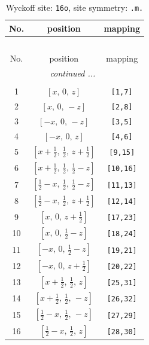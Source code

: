 \documentclass[fleqn,8pt]{jsarticle}
\begin{document}
\renewcommand{\arraystretch}{1.2}
\begin{longtable}{ccc}
\caption{Wyckoff site: {\tt 16o}, site symmetry: {\tt .m.}}
 \\
 \hline \hline
No. & position & mapping \\ \hline \endfirsthead

\multicolumn{2}{l}{\tablename\ \thetable{}} \\
 \hline \hline
No. & position & mapping \\ \hline \endhead

 \hline \hline
\multicolumn{2}{r}{\footnotesize\it continued ...} \\ \endfoot

 \hline \hline
\multicolumn{2}{r}{} \\ \endlastfoot

1 & $\left[ x,\, 0,\, z \right]$ & {\tt [1,7]} \\ \hline
2 & $\left[ x,\, 0,\, - z \right]$ & {\tt [2,8]} \\ \hline
3 & $\left[ - x,\, 0,\, - z \right]$ & {\tt [3,5]} \\ \hline
4 & $\left[ - x,\, 0,\, z \right]$ & {\tt [4,6]} \\ \hline
5 & $\left[ x + \frac{1}{2},\, \frac{1}{2},\, z + \frac{1}{2} \right]$ & {\tt [9,15]} \\ \hline
6 & $\left[ x + \frac{1}{2},\, \frac{1}{2},\, \frac{1}{2} - z \right]$ & {\tt [10,16]} \\ \hline
7 & $\left[ \frac{1}{2} - x,\, \frac{1}{2},\, \frac{1}{2} - z \right]$ & {\tt [11,13]} \\ \hline
8 & $\left[ \frac{1}{2} - x,\, \frac{1}{2},\, z + \frac{1}{2} \right]$ & {\tt [12,14]} \\ \hline
9 & $\left[ x,\, 0,\, z + \frac{1}{2} \right]$ & {\tt [17,23]} \\ \hline
10 & $\left[ x,\, 0,\, \frac{1}{2} - z \right]$ & {\tt [18,24]} \\ \hline
11 & $\left[ - x,\, 0,\, \frac{1}{2} - z \right]$ & {\tt [19,21]} \\ \hline
12 & $\left[ - x,\, 0,\, z + \frac{1}{2} \right]$ & {\tt [20,22]} \\ \hline
13 & $\left[ x + \frac{1}{2},\, \frac{1}{2},\, z \right]$ & {\tt [25,31]} \\ \hline
14 & $\left[ x + \frac{1}{2},\, \frac{1}{2},\, - z \right]$ & {\tt [26,32]} \\ \hline
15 & $\left[ \frac{1}{2} - x,\, \frac{1}{2},\, - z \right]$ & {\tt [27,29]} \\ \hline
16 & $\left[ \frac{1}{2} - x,\, \frac{1}{2},\, z \right]$ & {\tt [28,30]} \\
\end{longtable}
\end{document}
